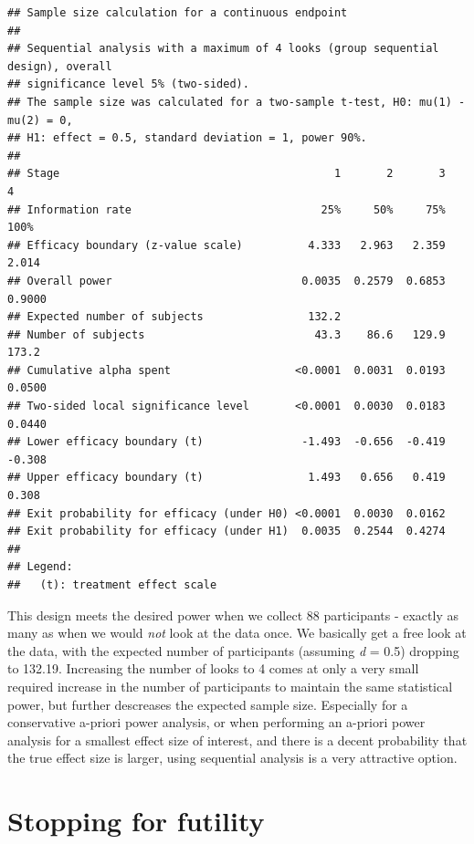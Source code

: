 \documentclass[
  oneside]{book}
\begin{document}
\begin{verbatim}
## Sample size calculation for a continuous endpoint
## 
## Sequential analysis with a maximum of 4 looks (group sequential design), overall 
## significance level 5% (two-sided).
## The sample size was calculated for a two-sample t-test, H0: mu(1) - mu(2) = 0, 
## H1: effect = 0.5, standard deviation = 1, power 90%.
## 
## Stage                                          1       2       3       4 
## Information rate                             25%     50%     75%    100% 
## Efficacy boundary (z-value scale)          4.333   2.963   2.359   2.014 
## Overall power                             0.0035  0.2579  0.6853  0.9000 
## Expected number of subjects                132.2 
## Number of subjects                          43.3    86.6   129.9   173.2 
## Cumulative alpha spent                   <0.0001  0.0031  0.0193  0.0500 
## Two-sided local significance level       <0.0001  0.0030  0.0183  0.0440 
## Lower efficacy boundary (t)               -1.493  -0.656  -0.419  -0.308 
## Upper efficacy boundary (t)                1.493   0.656   0.419   0.308 
## Exit probability for efficacy (under H0) <0.0001  0.0030  0.0162 
## Exit probability for efficacy (under H1)  0.0035  0.2544  0.4274 
## 
## Legend:
##   (t): treatment effect scale
\end{verbatim}

This design meets the desired power when we collect 88 participants - exactly as many as when we would \emph{not} look at the data once. We basically get a free look at the data, with the expected number of participants (assuming \emph{d} = 0.5) dropping to 132.19. Increasing the number of looks to 4 comes at only a very small required increase in the number of participants to maintain the same statistical power, but further descreases the expected sample size. Especially for a conservative a-priori power analysis, or when performing an a-priori power analysis for a smallest effect size of interest, and there is a decent probability that the true effect size is larger, using sequential analysis is a very attractive option.

\hypertarget{stopping-for-futility}{%
\section{Stopping for futility}\label{stopping-for-futility}}
\end{document}

